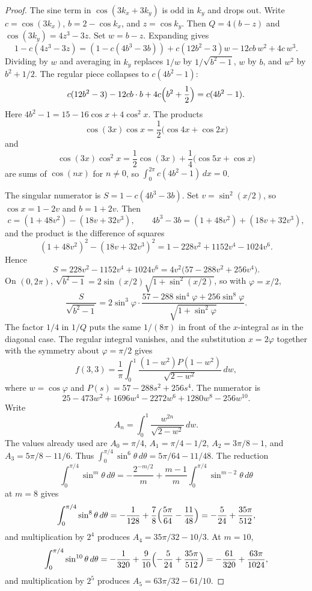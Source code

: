 \begin{proof}
The sine term in \(\cos(3k_x+3k_y)\) is odd in \(k_y\) and drops out.
Write \(c=\cos(3k_x)\), \(b=2-\cos k_x\), and \(z=\cos k_y\).
Then \(Q=4(b-z)\) and \(\cos(3k_y)=4z^3-3z\).
Set \(w=b-z\). Expanding gives
\[
1-c(4z^3-3z)
=(1-c(4b^3-3b))+c(12b^2-3)w-12cb\,w^2+4c\,w^3.
\]
Dividing by \(w\) and averaging in \(k_y\) replaces \(1/w\) by
\(1/\sqrt{b^2-1}\), \(w\) by \(b\), and \(w^2\) by \(b^2+1/2\).
The regular piece collapses to \(c(4b^2-1)\):
\[
c(12b^2-3)-12cb\cdot b+4c\Bigl(b^2+\frac12\Bigr)
=c(4b^2-1).
\]
Here \(4b^2-1=15-16\cos x+4\cos^2 x\).
The products
\[
\cos(3x)\cos x=\frac12\bigl(\cos 4x+\cos 2x\bigr)
\]
and
\[
\cos(3x)\cos^2 x
=\frac12\cos(3x)+\frac14\bigl(\cos 5x+\cos x\bigr)
\]
are sums of \(\cos(nx)\) for \(n\neq 0\), so
\(\int_0^{2\pi}c(4b^2-1)\,dx=0\).

The singular numerator is \(S=1-c(4b^3-3b)\).
Set \(v=\sin^2(x/2)\), so \(\cos x=1-2v\) and \(b=1+2v\).
Then
\[
c=(1+48v^2)-(18v+32v^3),
\qquad
4b^3-3b=(1+48v^2)+(18v+32v^3),
\]
and the product is the difference of squares
\[
(1+48v^2)^2-(18v+32v^3)^2
=1-228v^2+1152v^4-1024v^6.
\]
Hence
\[
S=228v^2-1152v^4+1024v^6
=4v^2\bigl(57-288v^2+256v^4\bigr).
\]
On \((0,2\pi)\),
\(\sqrt{b^2-1}=2\sin(x/2)\sqrt{1+\sin^2(x/2)}\), so with
\(\varphi=x/2\),
\[
\frac{S}{\sqrt{b^2-1}}
=2\sin^3\varphi\cdot
\frac{57-288\sin^4\varphi+256\sin^8\varphi}{\sqrt{1+\sin^2\varphi}}.
\]
The factor \(1/4\) in \(1/Q\) puts the same \(1/(8\pi)\) in front of the
\(x\)-integral as in the diagonal case.
The regular integral vanishes, and the substitution \(x=2\varphi\)
together with the symmetry about \(\varphi=\pi/2\) gives
\[
f(3,3)
=\frac{1}{\pi}\int_0^1
\frac{(1-w^2)P(1-w^2)}{\sqrt{2-w^2}}\,dw,
\]
where \(w=\cos\varphi\) and \(P(s)=57-288s^2+256s^4\).
The numerator is
\[
25-473w^2+1696w^4-2272w^6+1280w^8-256w^{10}.
\]
Write
\[
A_n=\int_0^1\frac{w^{2n}}{\sqrt{2-w^2}}\,dw.
\]
The values already used are \(A_0=\pi/4\), \(A_1=\pi/4-1/2\),
\(A_2=3\pi/8-1\), and \(A_3=5\pi/8-11/6\).
Thus \(\int_0^{\pi/4}\sin^6\theta\,d\theta=5\pi/64-11/48\).
The reduction
\[
\int_0^{\pi/4}\sin^m\theta\,d\theta
=-\frac{2^{-m/2}}{m}+\frac{m-1}{m}
\int_0^{\pi/4}\sin^{m-2}\theta\,d\theta
\]
at \(m=8\) gives
\[
\int_0^{\pi/4}\sin^8\theta\,d\theta
=-\frac1{128}+\frac78\Bigl(\frac{5\pi}{64}-\frac{11}{48}\Bigr)
=-\frac5{24}+\frac{35\pi}{512},
\]
and multiplication by \(2^4\) produces \(A_4=35\pi/32-10/3\).
At \(m=10\),
\[
\int_0^{\pi/4}\sin^{10}\theta\,d\theta
=-\frac1{320}+\frac9{10}\Bigl(-\frac5{24}+\frac{35\pi}{512}\Bigr)
=-\frac{61}{320}+\frac{63\pi}{1024},
\]
and multiplication by \(2^5\) produces \(A_5=63\pi/32-61/10\).

\end{proof}
